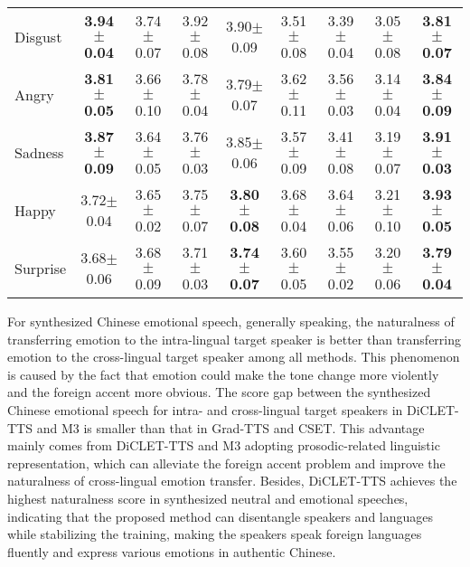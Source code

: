 \documentclass[journal,comsoc]{IEEEtran}
\begin{document}
\begin{table*}[h]
\begin{tabular}{l|cccc|cccc}
Disgust          &\bf{3.94}$\pm$0.04 &3.74$\pm$0.07 &3.92$\pm$0.08 &3.90$\pm$0.09   &3.51$\pm$0.08 &3.39$\pm$0.04 &3.05$\pm$0.08 &\bf{3.81}$\pm$0.07   \\ 
Angry            &\bf{3.81}$\pm$0.05 &3.66$\pm$0.10 &3.78$\pm$0.04 &3.79$\pm$0.07   &3.62$\pm$0.11 &3.56$\pm$0.03 &3.14$\pm$0.04 &\bf{3.84}$\pm$0.09   \\
Sadness          &\bf{3.87}$\pm$0.09 &3.64$\pm$0.05 &3.76$\pm$0.03 &3.85$\pm$0.06   &3.57$\pm$0.09 &3.41$\pm$0.08 &3.19$\pm$0.07 &\bf{3.91}$\pm$0.03  \\
Happy            &3.72$\pm$0.04 &3.65$\pm$0.02 &3.75$\pm$0.07 &\bf{3.80}$\pm$0.08   &3.68$\pm$0.04 &3.64$\pm$0.06 &3.21$\pm$0.10 &\bf{3.93}$\pm$0.05   \\
Surprise         &3.68$\pm$0.06 &3.68$\pm$0.09 &3.71$\pm$0.03 &\bf{3.74}$\pm$0.07    &3.60$\pm$0.05 &3.55$\pm$0.02 &3.20$\pm$0.06 &\bf{3.79}$\pm$0.04   \\ \bottomrule %
\end{tabular}
\end{table*}

For synthesized Chinese emotional speech, generally speaking, the naturalness of transferring emotion to the intra-lingual target speaker is better than transferring emotion to the cross-lingual target speaker among all methods.
This phenomenon is caused by the fact that emotion could make the tone change more violently and the foreign accent more obvious.
The score gap between the synthesized Chinese emotional speech for intra- and cross-lingual target speakers in DiCLET-TTS and M3 is smaller than that in Grad-TTS and CSET. 
This advantage mainly comes from DiCLET-TTS and M3 adopting prosodic-related linguistic representation, which can alleviate the foreign accent problem and improve the naturalness of cross-lingual emotion transfer.
Besides, DiCLET-TTS achieves the highest naturalness score in synthesized neutral and emotional speeches, indicating that the proposed method can disentangle speakers and languages while stabilizing the training, making the speakers speak foreign languages fluently and express various emotions in authentic Chinese.
\end{document}
